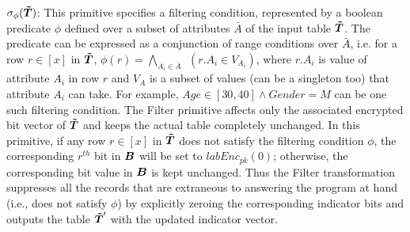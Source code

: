  $\sigma_{\phi}(\boldsymbol{\tilde{T}})$: This primitive specifies a filtering condition, represented by a boolean predicate $\phi$ defined over a subset of attributes $\bar{A}$ of the input table $\boldsymbol{\tilde{T}}$. The predicate can be expressed as a conjunction of range conditions over $\bar{A}$, i.e. for a row $r \in [x]$ in $\boldsymbol{\tilde{T}}$, $\phi(r) = \bigwedge_{A_i \in \bar{A}} ~~(r.{A_i} \in V_{A_i})$,  where $r.A_i$ is value of attribute $A_i$ in row $r$ and $V_A$ is a subset of values (can be a singleton too) that attribute $A_i$ can take.  For example, $Age\in [30,40]\wedge Gender=M$ can be one such  filtering condition. The \textsf{Filter} primitive affects only the associated encrypted bit vector of $\boldsymbol{\tilde{T}}$ and keeps the actual table completely unchanged.  In this primitive, if any row $r \in [x]$ in $\boldsymbol{\tilde{T}}$ does not satisfy the filtering condition $\phi$, the corresponding $r^{th}$ bit in $\boldsymbol{B}$ will be set to $labEnc_{pk}(0)$; otherwise, the corresponding bit value in $\boldsymbol{B}$ is kept unchanged. 
Thus the \textsf{Filter} transformation suppresses all the records that are extraneous to answering the program at hand (i.e., does not satisfy $\phi$) by explicitly zeroing the corresponding indicator bits and outputs the table $\boldsymbol{\tilde{T}}'$ with the updated indicator vector.


